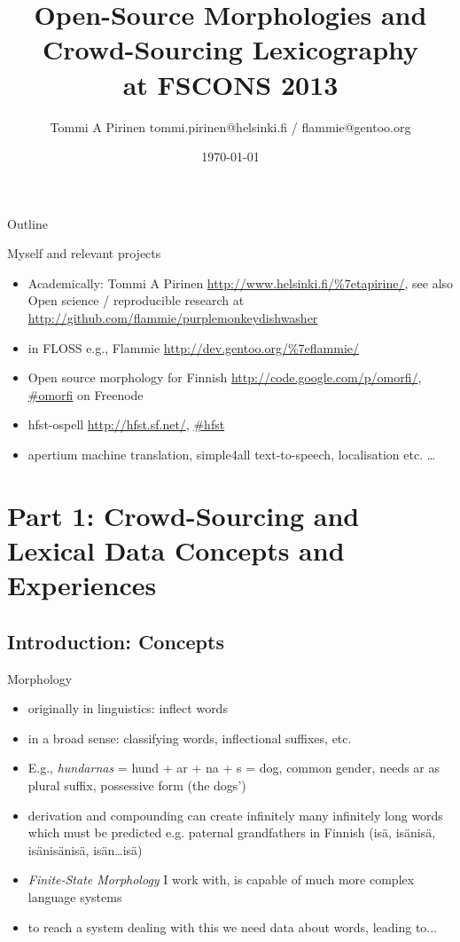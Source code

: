 \documentclass[t,12pt]{beamer}
\title[Open- and Crowd-sourced Lexicography]{Open-Source Morphologies and Crowd-Sourcing Lexicography\\\scriptsize{at FSCONS 2013}}
\author[Tommi A Pirinen]{Tommi A Pirinen \scriptsize \guilsinglleft{}tommi.pirinen@helsinki.fi\guilsinglright{} / \guilsinglleft{}flammie@gentoo.org\guilsinglright{}}
\institute[University of Helsinki]{Department of Speech Sciences\\University of Helsinki}
\date{\today}
\begin{document}

\HyTitle

\begin{frame}{Outline}
    \tableofcontents
\end{frame}

\begin{frame}{Myself and relevant projects}
    \begin{itemize}
        \item Academically: Tommi A Pirinen \url{http://www.helsinki.fi/\%7etapirine/}, see also Open science / reproducible research at \url{http://github.com/flammie/purplemonkeydishwasher}
        \item in FLOSS e.g., Flammie \url{http://dev.gentoo.org/\%7eflammie/}
        \item Open source morphology for Finnish \url{http://code.google.com/p/omorfi/}, \url{\#omorfi} on Freenode
        \item hfst-ospell \url{http://hfst.sf.net/}, \url{\#hfst}
        \item apertium machine translation, simple4all text-to-speech, 
            localisation etc. \ldots
    \end{itemize}
\end{frame}

\section{Part 1: Crowd-Sourcing and Lexical Data Concepts and Experiences}

\subsection{Introduction: Concepts}

\begin{frame}{Morphology}
    \begin{itemize}
        \item originally in linguistics: inflect words
        \item in a broad sense: classifying words, inflectional suffixes, etc.
        \item E.g., \emph{hundarnas} = hund + ar + na + s = dog, common gender,
            needs ar as plural suffix, possessive form (the dogs')
        \item derivation and compounding can create infinitely many
            infinitely long words which must be predicted e.g. paternal
            grandfathers in Finnish (isä, isänisä, isänisänisä, isän\ldots isä)
        \item \emph{Finite-State Morphology} I work with, is capable of
            much more complex language systems
        \item to reach a system dealing with this we need data about
            words, leading to...
    \end{itemize}
\end{frame}
\end{document}
